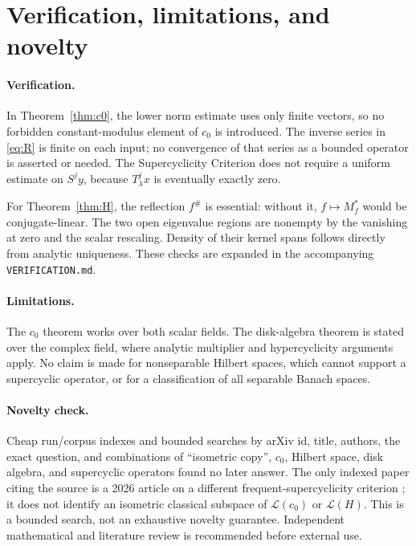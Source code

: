 \documentclass[11pt]{article}
\newcommand{\Lcal}{\mathcal L}
\begin{document}
\section{Verification, limitations, and novelty}

\paragraph{Verification.}
In Theorem~\ref{thm:c0}, the lower norm estimate uses only finite vectors,
so no forbidden constant-modulus element of $c_0$ is introduced. The inverse
series in \eqref{eq:R} is finite on each input; no convergence of that series
as a bounded operator is asserted or needed. The Supercyclicity Criterion
does not require a uniform estimate on $S^j y$, because $T_\lambda^j x$ is
eventually exactly zero.

For Theorem~\ref{thm:H}, the reflection $f^\#$ is essential: without it,
$f\mapsto M_f^*$ would be conjugate-linear. The two open eigenvalue regions
are nonempty by the vanishing at zero and the scalar rescaling. Density of
their kernel spans follows directly from analytic uniqueness. These checks
are expanded in the accompanying \texttt{VERIFICATION.md}.

\paragraph{Limitations.}
The $c_0$ theorem works over both scalar fields. The disk-algebra theorem is
stated over the complex field, where analytic multiplier and hypercyclicity
arguments apply. No claim is made for nonseparable Hilbert spaces, which
cannot support a supercyclic operator, or for a classification of all
separable Banach spaces.

\paragraph{Novelty check.}
Cheap run/corpus indexes and bounded searches by arXiv id, title, authors,
the exact question, and combinations of ``isometric copy'', $c_0$, Hilbert
space, disk algebra, and supercyclic operators found no later answer. The
only indexed paper citing the source is a 2026 article on a different
frequent-supercyclicity criterion \cite{later}; it does not identify an
isometric classical subspace of $\Lcal(c_0)$ or $\Lcal(H)$. This is a bounded
search, not an exhaustive novelty guarantee. Independent mathematical and
literature review is recommended before external use.
\end{document}
